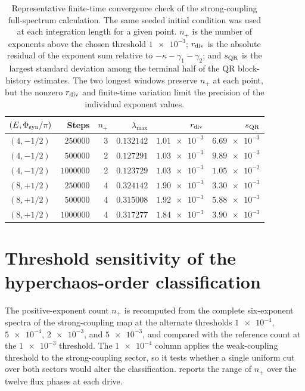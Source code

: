 \documentclass[Phys]{SciPost}
\begin{document}
\begin{table}[h]
  \centering
  \caption{Representative finite-time convergence check of the strong-coupling
  full-spectrum calculation. The same seeded initial condition was used at each
  integration length for a given point. $n_{+}$ is the number of exponents above
  the chosen threshold $\num{1e-3}$; $r_{\rm div}$ is the absolute residual of
  the exponent sum relative to $-\kappa-\gamma_1-\gamma_2$; and $s_{\rm QR}$ is
  the largest standard deviation among the terminal half of the QR block-history
  estimates. The two longest windows preserve $n_{+}$ at each point, but the
  nonzero $r_{\rm div}$ and finite-time variation limit the precision of the
  individual exponent values.}
  \label{SI-tab:si-hyperchaos-convergence}
  \begin{tabular}{@{}lrrrrr@{}}
    \toprule
    $(E,\Phi_{\rm syn}/\pi)$ & Steps & $n_{+}$ & $\lambda_{\max}$ & $r_{\rm div}$ & $s_{\rm QR}$ \\
    \midrule
    $(4,-1/2)$ & $\num{250000}$ & 3 & $\num{0.132142}$ & $\num{1.01e-3}$ & $\num{6.69e-3}$ \\
    $(4,-1/2)$ & $\num{500000}$ & 2 & $\num{0.127291}$ & $\num{1.03e-3}$ & $\num{9.89e-3}$ \\
    $(4,-1/2)$ & $\num{1000000}$ & 2 & $\num{0.123729}$ & $\num{1.03e-3}$ & $\num{1.05e-2}$ \\
    $(8,+1/2)$ & $\num{250000}$ & 4 & $\num{0.324142}$ & $\num{1.90e-3}$ & $\num{3.30e-3}$ \\
    $(8,+1/2)$ & $\num{500000}$ & 4 & $\num{0.315008}$ & $\num{1.92e-3}$ & $\num{5.88e-3}$ \\
    $(8,+1/2)$ & $\num{1000000}$ & 4 & $\num{0.317277}$ & $\num{1.84e-3}$ & $\num{3.90e-3}$ \\
    \bottomrule
  \end{tabular}
\end{table}

\section{Threshold sensitivity of the hyperchaos-order classification}
\label{SI-sec:threshold-sensitivity}

The positive-exponent count $n_{+}$ is recomputed from the complete
six-exponent spectra of the strong-coupling map at the alternate
thresholds $\num{1e-4}$, $\num{5e-4}$, $\num{2e-3}$, and
$\num{5e-3}$, and compared with the reference count at the
$\num{1e-3}$ threshold. The $\num{1e-4}$ column applies the weak-coupling
threshold to the strong-coupling sector, so it tests whether a single uniform
cut over both sectors would alter the classification. 
reports the range of $n_{+}$ over the twelve flux phases at each drive.
\end{document}
